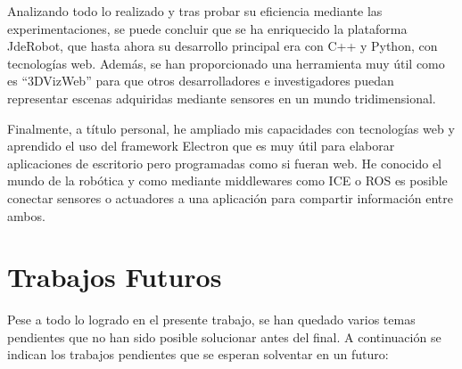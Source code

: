 Analizando todo lo realizado y tras probar su eficiencia mediante las experimentaciones, se puede concluir que se ha enriquecido la plataforma JdeRobot, que hasta ahora su desarrollo principal era con C++ y Python, con tecnologías web. Además, se han proporcionado una herramienta muy útil como es ``3DVizWeb'' para que otros desarrolladores e investigadores puedan representar escenas adquiridas mediante sensores en un mundo tridimensional.

Finalmente, a título personal, he ampliado mis capacidades con tecnologías web y aprendido el uso del framework Electron que es muy útil para elaborar aplicaciones de escritorio pero programadas como si fueran web. He conocido el mundo de la robótica y como mediante middlewares como ICE o ROS es posible conectar sensores o actuadores a una aplicación para compartir información entre ambos.

\section{Trabajos Futuros}
Pese a todo lo logrado en el presente trabajo, se han quedado varios temas pendientes que no han sido posible solucionar antes del final. A continuación se indican los trabajos pendientes que se esperan solventar en un futuro:

